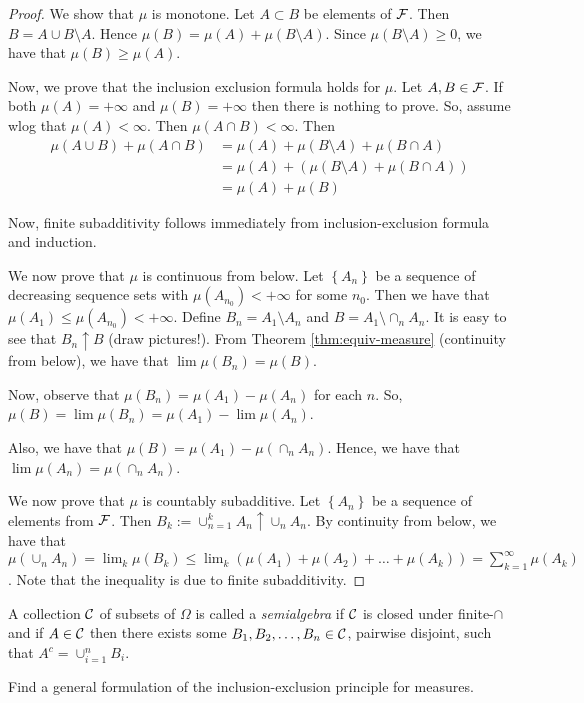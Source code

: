 \begin{proof}
    We show that $\mu$ is monotone. Let $A \subset B$ be elements of ${\cal F}$. Then $B=A\cup B\setminus A$. Hence $\mu (B) = \mu (A) + \mu (B\setminus A)$. Since $\mu (B\setminus A ) \ge 0$, we have that $\mu (B) \ge \mu (A)$. 

    Now, we prove that the inclusion exclusion formula holds for $\mu$. Let $A, B\in {\cal F}$. If both $\mu(A) = +\infty$ and $\mu (B) = + \infty$ then there is nothing to prove. So, assume wlog that $\mu (A) < \infty$. Then $\mu (A \cap B) < \infty$.  Then
    \begin{align*}
	\mu (A \cup B) + \mu (A\cap B) &= \mu (A) + \mu (B \setminus A) + \mu (B\cap A)  \\
	&= \mu (A) + (\mu (B \setminus A) + \mu (B\cap A))  \\
	&= \mu (A) + \mu (B)
    \end{align*}

    Now, finite subadditivity follows immediately from inclusion-exclusion formula and induction.

    We now prove that $\mu$ is continuous from below. Let $\left\{ A_n \right\}$ be a sequence of decreasing sequence sets with $\mu (A_{n_0}) < +\infty$ for some $n_0$. Then we have that $\mu (A_1) \le \mu (A_{n_0}) < +\infty$. Define $B_n = A_1 \setminus A_n$ and $B=A_1 \setminus \cap_n A_n$. It is easy to see that $B_n \uparrow B$ (draw pictures!). From Theorem \ref{thm:equiv-measure} (continuity from below), we have that $\lim \mu (B_n ) = \mu (B)$.   

    Now, observe that $\mu (B_n ) = \mu (A_1) - \mu (A_n )$ for each $n$. So, $\mu (B) = \lim \mu (B_n) = \mu (A_1) - \lim \mu (A_n)$. 

    Also, we have that $\mu (B) = \mu (A_1) - \mu (\cap_n A_n )$. Hence, we have that $\lim \mu (A_n ) = \mu \left( \cap_n A_n \right)$. 

    We now prove that $\mu$ is countably subadditive. Let $\left\{ A_n \right\}$ be a sequence of elements from ${\cal F}$. Then $B_k := \cup_{n=1}^{k} A_n \uparrow \cup_{n} A_n$. By continuity from below, we have that $\mu \left( \cup_n A_n \right) = \lim_k \mu (B_k) \le \lim_k \left( \mu (A_1) + \mu (A_2) + \ldots + \mu (A_k) \right)= \sum_{k=1}^{\infty} \mu (A_k)$. Note that the inequality is due to finite subadditivity.
\end{proof}

\begin{definition}
    A collection ${\cal C}$ of subsets of $\Omega$ is called a \textit{semialgebra} if ${\cal C}$ is closed under finite-$\cap$ and if $A\in {\cal C}$ then there exists some $B_1, B_2 , \ldots , B_n \in {\cal C}$, pairwise disjoint, such that $A^c = \cup_{i=1}^{n} B_i$.
    \label{def:semialgebra}
\end{definition}

\begin{exercise}
    Find a general formulation of the inclusion-exclusion principle for measures.
\end{exercise}
